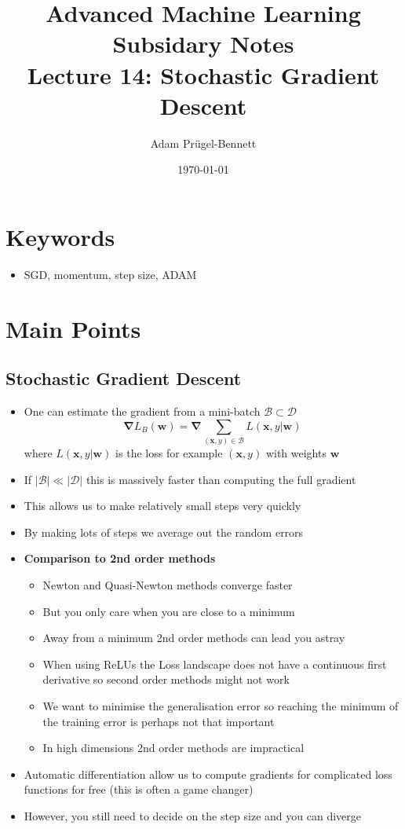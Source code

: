 \documentclass[11pt]{article}
\author{Adam Prügel-Bennett}
\date{\today}
\title{Advanced Machine Learning Subsidary Notes\\\medskip
\large Lecture 14: Stochastic Gradient Descent}
\newcommand{\grad}{\bm{\nabla}}
\begin{document}
\maketitle


\section{Keywords}
\label{sec:orgc6928fb}
\begin{itemize}
\item SGD, momentum, step size, ADAM
\end{itemize}

\section{Main Points}
\label{sec:orgf6d650e}

\subsection{Stochastic Gradient Descent}
\label{sec:org3d28a6d}
\begin{itemize}
\item One can estimate the gradient from a mini-batch
\(\mathcal{B}\subset\mathcal{D}\)
$$ \grad L_B(\bm{w}) = \grad \sum_{(\bm{x},y)\in\mathcal{B}} L(\bm{x},y|\bm{w}) $$
where \(L(\bm{x},y|\bm{w})\) is the loss for example \((\bm{x},y)\) with weights \(\bm{w}\)
\item If \(|\mathcal{B}| \ll |\mathcal{D}|\) this is massively faster
than computing the full gradient
\item This allows us to make relatively small steps very quickly
\item By making lots of steps we average out the random errors
\item \textbf{Comparison to 2nd order methods}
\begin{itemize}
\item Newton and Quasi-Newton methods converge faster
\item But you only care when you are close to a minimum
\item Away from a minimum 2nd order methods can lead you astray
\item When using ReLUs the Loss landscape does not have a continuous
first derivative so second order methods might not work
\item We want to minimise the generalisation error so reaching the
minimum of the training error is perhaps not that important
\item In high dimensions 2nd order methods are impractical
\end{itemize}
\item Automatic differentiation allow us to compute gradients for
complicated loss functions for free (this is often a game changer)
\item However, you still need to decide on the step size and you can diverge
\end{itemize}
\end{document}
